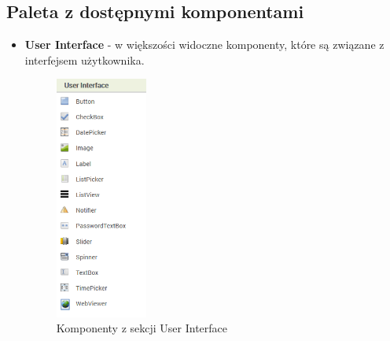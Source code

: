 \subsection{Paleta z dostępnymi komponentami}

\begin{itemize}

\item \textbf{User Interface} - w większości widoczne komponenty, które są związane z interfejsem użytkownika.

\begin{figure}[H] 
\centering\includegraphics[height=8cm]{figures/components/userinterface}
\caption{Komponenty z sekcji User Interface}
\end{figure}


\end{itemize}
